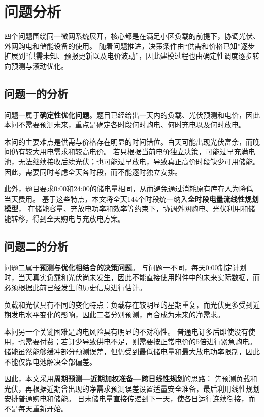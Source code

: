 \section{问题分析}

四个问题围绕同一微网系统展开，核心都是在满足小区负载的前提下，协调光伏、外网购电和储能设备的使用。
随着问题推进，决策条件由“供需和价格已知”逐步扩展到“供需未知、预报更新以及电价波动”，因此建模过程也由确定性调度逐步转向预测与滚动优化。

\subsection{问题一的分析}

问题一属于\textbf{确定性优化问题}。题目已经给出一天内的负载、光伏预测和电价，因此本问不需要预测未来，重点是确定各时段何时购电、何时充电以及何时放电。

本问的主要难点是供需与价格存在明显的时间错位。白天可能出现光伏富余，而晚间仍有较大用电需求和较高电价。
若只根据当前电价独立决策，可能过早充满电池，无法继续接收后续光伏；也可能过早放电，导致真正高价时段缺少可用储能。
因此，需要同时考虑全天各时段，而不能逐时独立安排。

此外，题目要求0:00和24:00的储电量相同，从而避免通过消耗原有库存人为降低当天费用。
基于这些特点，本文将全天144个时段统一纳入\textbf{全时段电量流线性规划模型}，
在储能容量、充放电功率和效率等约束下，协调外网购电、光伏利用和储能转移，得到全天购电与充放电方案。

\subsection{问题二的分析}

问题二属于\textbf{预测与优化相结合的决策问题}。
与问题一不同，每天0:00制定计划时，当天真实负载和光伏尚未发生，因此不能直接使用附件中的未来实际数据，而必须根据此前已经发生的历史信息进行估计。

负载和光伏具有不同的变化特点：负载存在较明显的星期重复，而光伏更多受到近期发电水平变化的影响，因此二者分别预测，再合成为未来的净需求。

本问另一个关键困难是购电风险具有明显的不对称性。
普通电订多后即使没有使用，也需要付费；若订少导致供电不足，则需要按正常电价的5倍进行紧急购电。
储能虽然能够缓冲部分预测误差，但仍受到最低储电量和最大放电功率限制，因此不能仅靠电池解决全部偏差。

因此，本文采用\textbf{周期预测—近期加权准备—跨日线性规划}的思路：
先预测负载和光伏，再根据近期曾出现的净需求预测误差设置适量安全准备，最后利用线性规划安排普通购电和储能。
日末储电量直接传递到下一天，使各日运行连续衔接，而不是每天重新开始。

